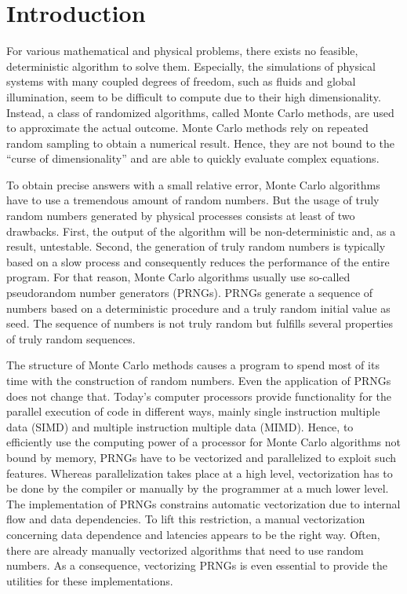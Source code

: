 \documentclass{stdlocal}
\begin{document}
\section{Introduction} %
\label{sec:introduction}

For various mathematical and physical problems, there exists no feasible, deterministic algorithm to solve them.
Especially, the simulations of physical systems with many coupled degrees of freedom, such as fluids and global illumination, seem to be difficult to compute due to their high dimensionality.
Instead, a class of randomized algorithms, called Monte Carlo methods, are used to approximate the actual outcome.
Monte Carlo methods rely on repeated random sampling to obtain a numerical result.
Hence, they are not bound to the \enquote{curse of dimensionality} and are able to quickly evaluate complex equations.
\autocite{pharr2016,bauke2007,mueller2012,landau2014}

To obtain precise answers with a small relative error, Monte Carlo algorithms have to use a tremendous amount of random numbers.
But the usage of truly random numbers generated by physical processes consists at least of two drawbacks.
First, the output of the algorithm will be non-deterministic and, as a result, untestable.
Second, the generation of truly random numbers is typically based on a slow process and consequently reduces the performance of the entire program.
For that reason, Monte Carlo algorithms usually use so-called pseudorandom number generators (PRNGs).
PRNGs generate a sequence of numbers based on a deterministic procedure and a truly random initial value as seed.
The sequence of numbers is not truly random but fulfills several properties of truly random sequences.
\autocite{bauke2007,intel-drng,lecuyer1994,lecuyer2015,lecuyer2017,volchan2002}

The structure of Monte Carlo methods causes a program to spend most of its time with the construction of random numbers.
Even the application of PRNGs does not change that.
Today's computer processors provide functionality for the parallel execution of code in different ways, mainly single instruction multiple data (SIMD) and multiple instruction multiple data (MIMD).
Hence, to efficiently use the computing power of a processor for Monte Carlo algorithms not bound by memory, PRNGs have to be vectorized and parallelized to exploit such features.
Whereas parallelization takes place at a high level, vectorization has to be done by the compiler or manually by the programmer at a much lower level.
The implementation of PRNGs constrains automatic vectorization due to internal flow and data dependencies.
To lift this restriction, a manual vectorization concerning data dependence and latencies appears to be the right way.
Often, there are already manually vectorized algorithms that need to use random numbers.
As a consequence, vectorizing PRNGs is even essential to provide the utilities for these implementations.
\autocite{lecuyer2017,bauke2007,hennessy2019,patterson2014,barash2017,dolbeau2016,intel-optimization-reference,fog2019a,fog2019b,fog2019c,fog2019d,fog2019e}
\end{document}
